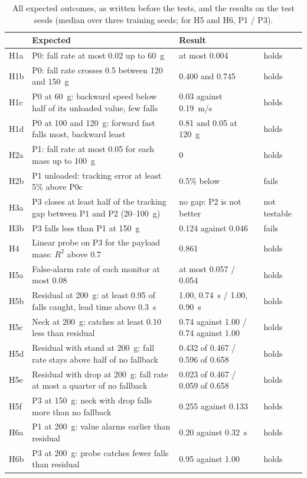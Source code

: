 \documentclass[conference]{IEEEtran}
\begin{document}
\begin{table}[t]
\centering
\caption{All expected outcomes, as written before the tests, and the results on the test seeds (median over three training seeds; for H5 and H6, P1 / P3).}
\label{tab:hypotheses}
\footnotesize
\begin{tabular}{@{}llll@{}}
\toprule
 & Expected & Result & \\
\midrule
H1a & P0: fall rate at most 0.02 up to \SI{60}{g} & at most 0.004 & holds\\
H1b & P0: fall rate crosses 0.5 between 120 and \SI{150}{g} & 0.400 and 0.745 & holds\\
H1c & P0 at \SI{60}{g}: backward speed below half of its unloaded value, few falls & 0.03 against \SI{0.19}{m/s} & holds\\
H1d & P0 at 100 and \SI{120}{g}: forward fast falls most, backward least & 0.81 and 0.05 at \SI{120}{g} & holds\\
\midrule
H2a & P1: fall rate at most 0.05 for each mass up to \SI{100}{g} & 0 & holds\\
H2b & P1 unloaded: tracking error at least 5\% above P0c & 0.5\% below & fails\\
H3a & P3 closes at least half of the tracking gap between P1 and P2 (20--\SI{100}{g}) & no gap: P2 is not better & not testable\\
H3b & P3 falls less than P1 at \SI{150}{g} & 0.124 against 0.046 & fails\\
H4 & Linear probe on P3 for the payload mass: $R^2$ above 0.7 & 0.861 & holds\\
\midrule
H5a & False-alarm rate of each monitor at most 0.08 & at most 0.057 / 0.054 & holds\\
H5b & Residual at \SI{200}{g}: at least 0.95 of falls caught, lead time above \SI{0.3}{s} & 1.00, \SI{0.74}{s} / 1.00, \SI{0.90}{s} & holds\\
H5c & Neck at \SI{200}{g}: catches at least 0.10 less than residual & 0.74 against 1.00 / 0.74 against 1.00 & holds\\
H5d & Residual with stand at \SI{200}{g}: fall rate stays above half of no fallback & 0.432 of 0.467 / 0.596 of 0.658 & holds\\
H5e & Residual with drop at \SI{200}{g}: fall rate at most a quarter of no fallback & 0.023 of 0.467 / 0.059 of 0.658 & holds\\
H5f & P3 at \SI{150}{g}: neck with drop falls more than no fallback & 0.255 against 0.133 & holds\\
H6a & P1 at \SI{200}{g}: value alarms earlier than residual & 0.20 against \SI{0.32}{s} & holds\\
H6b & P3 at \SI{200}{g}: probe catches fewer falls than residual & 0.95 against 1.00 & holds\\
\bottomrule
\end{tabular}
\end{table}
\end{document}
